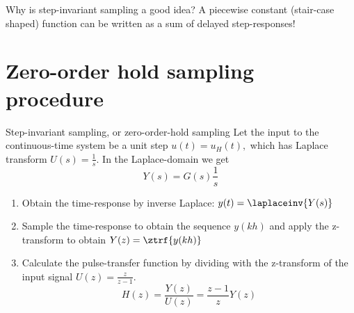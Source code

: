 \documentclass[presentation,aspectratio=169]{beamer}
\begin{document}
\begin{frame}[label={sec:org9a2df7c}]{Why is step-invariant sampling a good idea?}
A piecewise constant (stair-case shaped) function can be written as a sum of delayed step-responses!
\begin{center}
\end{center}
\end{frame}


\section{Zero-order hold sampling procedure}
\label{sec:org7b5acae}
\begin{frame}[label={sec:orgf361638}]{Step-invariant sampling, or zero-order-hold sampling}
Let the input to the continuous-time system be a unit step \(u(t)=u_H(t),\) which has Laplace transform \(U(s)=\frac{1}{s}.\) In the Laplace-domain we get
\[Y(s) = G(s)\frac{1}{s}\]
\begin{enumerate}
\item Obtain the time-response by inverse Laplace: \(y(t)=\laplaceinv{Y(s)}\)
\item Sample the time-response to obtain the sequence \(y(kh)\) and apply  the z-transform to obtain \(Y(z) = \ztrf{y(kh)}\)
\item Calculate the pulse-transfer function by dividing with the z-transform of the input signal \(U(z) = \frac{z}{z-1}.\) \[H(z) = \frac{Y(z)}{U(z)} = \frac{z-1}{z}Y(z) \]
\end{enumerate}
\end{frame}
\end{document}
